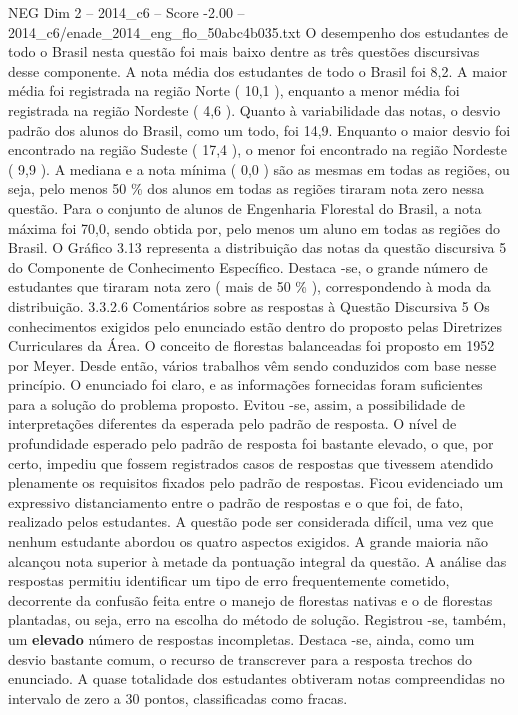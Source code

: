 \begin{textsample}{NEG Dim 2 – 2014\_c6 – Score -2.00 – 2014\_c6/enade\_2014\_eng\_flo\_50abc4b035.txt}
O desempenho dos estudantes de todo o Brasil nesta questão foi mais baixo dentre as três questões discursivas desse componente.
A nota média dos estudantes de todo o Brasil foi 8,2.
A maior média foi registrada na região Norte ( 10,1 ), enquanto a menor média foi registrada na região Nordeste ( 4,6 ).
Quanto à variabilidade das notas, o desvio padrão dos alunos do Brasil, como um todo, foi 14,9.
Enquanto o maior desvio foi encontrado na região Sudeste ( 17,4 ), o menor foi encontrado na região Nordeste ( 9,9 ).
A mediana e a nota mínima ( 0,0 ) são as mesmas em todas as regiões, ou seja, pelo menos 50 \% dos alunos em todas as regiões tiraram nota zero nessa questão.
Para o conjunto de alunos de Engenharia Florestal do Brasil, a nota máxima foi 70,0, sendo obtida por, pelo menos um aluno em todas as regiões do Brasil.
O Gráfico 3.13 representa a distribuição das notas da questão discursiva 5 do Componente de Conhecimento Específico.
Destaca -se, o grande número de estudantes que tiraram nota zero ( mais de 50 \% ), correspondendo à moda da distribuição. 3.3.2.6 Comentários sobre as respostas à Questão Discursiva 5 Os conhecimentos exigidos pelo enunciado estão dentro do proposto pelas Diretrizes Curriculares da Área.
O conceito de florestas balanceadas foi proposto em 1952 por Meyer.
Desde então, vários trabalhos vêm sendo conduzidos com base nesse princípio.
O enunciado foi claro, e as informações fornecidas foram suficientes para a solução do problema proposto.
Evitou -se, assim, a possibilidade de interpretações diferentes da esperada pelo padrão de resposta.
O nível de profundidade esperado pelo padrão de resposta foi bastante elevado, o que, por certo, impediu que fossem registrados casos de respostas que tivessem atendido plenamente os requisitos fixados pelo padrão de respostas.
Ficou evidenciado um expressivo distanciamento entre o padrão de respostas e o que foi, de fato, realizado pelos estudantes.
A questão pode ser considerada difícil, uma vez que nenhum estudante abordou os quatro aspectos exigidos.
A grande maioria não alcançou nota superior à metade da pontuação integral da questão.
A análise das respostas permitiu identificar um tipo de erro frequentemente cometido, decorrente da confusão feita entre o manejo de florestas nativas e o de florestas plantadas, ou seja, erro na escolha do método de solução.
Registrou -se, também, um \textbf{elevado} número de respostas incompletas.
Destaca -se, ainda, como um desvio bastante comum, o recurso de transcrever para a resposta trechos do enunciado.
A quase totalidade dos estudantes obtiveram notas compreendidas no intervalo de zero a 30 pontos, classificadas como fracas.

\end{textsample}
